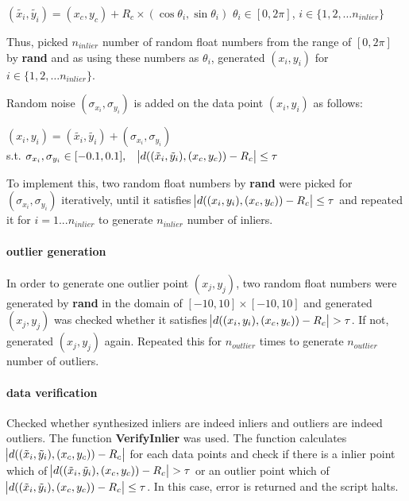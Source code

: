 \documentclass[paper=a4, fontsize=11pt]{scrartcl} %
\numberwithin{equation}{section} %
\numberwithin{figure}{section} %
\numberwithin{table}{section} %
\newcommand{\funcname}[1]{\textbf{#1}}
\begin{document}
\begin{center}
$(\tilde{x_{i}}, \tilde{y_{i}}) = (x_{c}, y_{c}) + R_{c} \times (\cos \theta_{i}, \sin \theta_{i})$ \qquad $\theta_{i} \in [0, 2 \pi]$, $i \in \{1, 2, \dots n_{inlier} \}$
\end{center}

Thus, picked $n_{inlier}$ number of random float numbers from the range of  $[0, 2 \pi]$ by \funcname{rand} and as using these numbers as $\theta_{i}$, generated $(x_{i}, y_{i})$ for $i \in \{1, 2, \dots n_{inlier} \}$.  

Random noise $(\sigma_{x_{i}}, \sigma_{y_{i}})$ is added on the data point $(x_{i}, y_{i})$ as follows:

\begin{center}
$(x_{i}, y_{i}) = (\tilde{x_{i}}, \tilde{y_{i}}) + (\sigma_{x_{i}}, \sigma_{y_{i}})$ \\
s.t. $\sigma_{x_{i}}, \sigma_{y_{i}} \in [-0.1, 0.1], \quad \abs{d((\tilde{x}_{i}, \tilde{y}_{i}), (x_{c}, y_{c})) - R_{c}} \leq \tau $
\end{center}

To implement this, two random float numbers by \funcname{rand} were picked for $(\sigma_{x_{i}}, \sigma_{y_{i}})$ iteratively, until it satisfies $\abs{d((x_{i}, y_{i}), (x_{c}, y_{c})) - R_{c}} \leq \tau$ and repeated it for $i=1...n_{inlier}$ to generate $n_{inlier}$ number of inliers.

\paragraph{outlier generation}

In order to generate one outlier point $(x_{j}, y_{j})$, two random float numbers were generated by \funcname{rand} in the domain of $[-10, 10] \times [-10, 10]$ and generated $(x_{j}, y_{j})$ was checked whether it satisfies $\abs{d((x_{i}, y_{i}), (x_{c}, y_{c})) - R_{c}} > \tau$. If not, generated $(x_{j}, y_{j})$ again. Repeated this for $n_{outlier}$ times to generate $n_{outlier}$ number of outliers.

\paragraph{data verification}

Checked whether synthesized inliers are indeed inliers and outliers are indeed outliers. The function \funcname{VerifyInlier} was used. The function calculates $\abs{d((\tilde{x}_{i}, \tilde{y}_{i}), (x_{c}, y_{c})) - R_{c}}$ for each data points and check if there is a inlier point which of $\abs{d((\tilde{x}_{i}, \tilde{y}_{i}), (x_{c}, y_{c})) - R_{c}} > \tau$ or an outlier point which of $\abs{d((\tilde{x}_{i}, \tilde{y}_{i}), (x_{c}, y_{c})) - R_{c}} \leq \tau$. In this case, error is returned and the script halts. 
\end{document}
